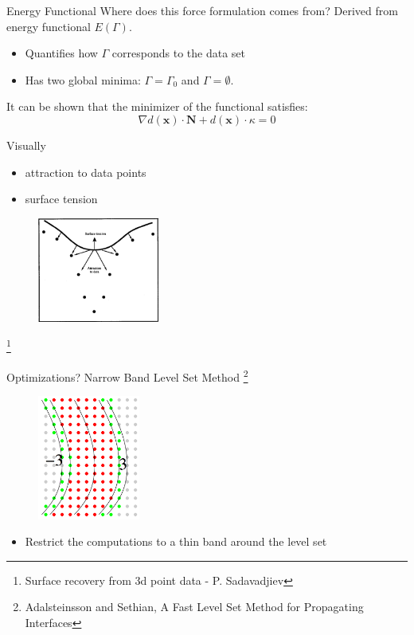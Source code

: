 \documentclass{beamer}
\begin{document}
\begin{frame}{Energy Functional}
Where does this force formulation comes from? Derived from energy functional $E(\Gamma)$.
\begin{itemize}
\item Quantifies how $\Gamma$ corresponds to the data set
\item Has two global minima: $\Gamma = \Gamma_0$  and $\Gamma = \emptyset$.
\end{itemize}
It can be shown that the minimizer of the functional satisfies:
\[
\nabla d(\mathbf{x}) \cdot \mathbf{N} + d(\mathbf{x}) \cdot \kappa = 0
\]
\end{frame}
\begin{frame}{Visually}
\begin{itemize}
\item attraction to data points
\item surface tension
\end{itemize}
\begin{figure}[H]
\centering
\includegraphics[width=40mm]{img/savadjiev3_3.png}
\end{figure}\footnote{Surface recovery from 3d point data - P. Sadavadjiev}
\end{frame}


\begin{frame}{Optimizations?}
  Narrow Band Level Set Method \footnote{Adalsteinsson and Sethian, A Fast Level Set Method for Propagating Interfaces}
  \begin{figure}[H]
  \centering
  \includegraphics[width=0.3\textwidth]{img/narrow_band.png}
  \end{figure}
  \begin{itemize}
  \item Restrict the computations to a thin band around the level set
  \end{itemize}
\end{frame}
\end{document}
